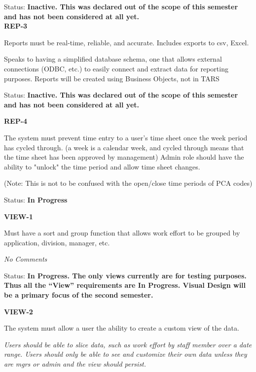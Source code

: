 \noindent Status: \textbf{Inactive.   This was declared out of the scope of this semester and has not been considered at all yet.}\\

  

\noindent \textbf{REP-3}

\noindent Reports must be real-time, reliable, and accurate. Includes exports to csv, Excel.

\noindent Speaks to having a simplified database schema, one that allows external connections (ODBC, etc.) to easily connect and extract data for reporting purposes. Reports will be created using Business Objects, not in TARS

\noindent Status: \textbf{Inactive.   This was declared out of the scope of this semester and has not been considered at all yet.}\\

\noindent 

\noindent \textbf{REP-4}

\noindent The system must prevent time entry to a user's time sheet once the week period has cycled through. (a week is a calendar week, and cycled through means that the time sheet has been approved by management)  Admin role should have the ability to "unlock" the time period and allow time sheet changes.
	
\noindent(Note: This is not to be confused with the open/close time periods of PCA codes)

\noindent Status: \textbf{In Progress}\\

\noindent

\noindent \textbf{VIEW-1}

\noindent Must have a sort and group function that allows work effort to be grouped by application, division, manager, etc.

 \textit{No Comments}

\noindent Status: \textbf{In Progress.  The only views currently are for testing purposes.  Thus all the ``View'' requirements are In Progress.  Visual Design will be a primary focus of the second semester.}\textit{ }\\

\noindent \textit{}

\noindent \textbf{VIEW-2}

\noindent The system must allow a user the ability to create a custom view of the data.

\noindent \textit{Users should be able to slice data, such as work effort by staff member over a date range. Users should only be able to see and customize their own data unless they are mgrs or admin and the view should persist.}

